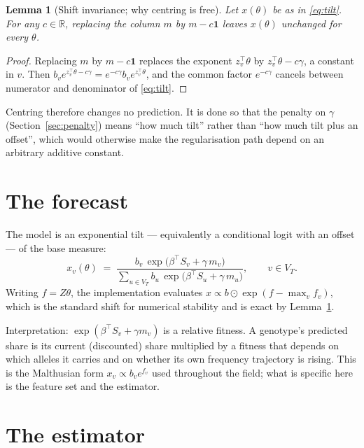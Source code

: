 \documentclass[11pt]{article}
\newtheorem{lemma}{Lemma}
\theoremstyle{remark}
\newcommand{\R}{\mathbb{R}}
\newcommand{\1}{\mathbf{1}}
\newcommand{\VT}{V_T}
\begin{document}
\begin{lemma}[Shift invariance; why centring is free]\label{lem:shift}
Let $x(\theta)$ be as in \eqref{eq:tilt}. For any $c \in \R$, replacing the column $m$ by
$m - c\1$ leaves $x(\theta)$ unchanged for every $\theta$.
\end{lemma}
\begin{proof}
Replacing $m$ by $m - c\1$ replaces the exponent $z_v^\top\theta$ by
$z_v^\top\theta - c\gamma$, a constant in $v$. Then
$b_v e^{z_v^\top\theta - c\gamma} = e^{-c\gamma} b_v e^{z_v^\top\theta}$, and the common
factor $e^{-c\gamma}$ cancels between numerator and denominator of \eqref{eq:tilt}.
\end{proof}

Centring therefore changes no prediction. It is done so that the penalty on $\gamma$
(Section~\ref{sec:penalty}) means ``how much tilt'' rather than ``how much tilt plus an
offset'', which would otherwise make the regularisation path depend on an arbitrary
additive constant.

\section{The forecast}\label{sec:tilt}

The model is an exponential tilt --- equivalently a conditional logit with an offset ---
of the base measure:
\begin{equation}
  \boxed{\;
  x_v(\theta) \;=\;
  \frac{b_v \, \exp\!\bigl(\beta^\top S_v + \gamma\, m_v\bigr)}
       {\displaystyle\sum_{u \in \VT} b_u \, \exp\!\bigl(\beta^\top S_u + \gamma\, m_u\bigr)},
  \qquad v \in \VT .
  \;}
  \label{eq:tilt}
\end{equation}
Writing $f = Z\theta$, the implementation evaluates
$x \propto b \odot \exp(f - \max_v f_v)$, which is the standard shift for numerical
stability and is exact by Lemma~\ref{lem:shift}.

Interpretation: $\exp(\beta^\top S_v + \gamma m_v)$ is a relative fitness. A genotype's
predicted share is its current (discounted) share multiplied by a fitness that depends on
which alleles it carries and on whether its own frequency trajectory is rising. This is
the Malthusian form $x_v \propto b_v e^{f_v}$ used throughout the field; what is specific
here is the feature set and the estimator.

\section{The estimator}
\end{document}
